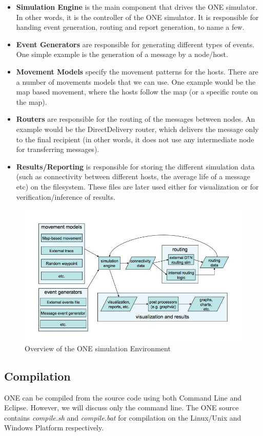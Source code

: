 \begin{itemize}
  \item \textbf{Simulation Engine} is the main component that drives the ONE simulator. In other words, it is the controller of the ONE simulator. It is responsible for handing event generation, routing and report generation, to name a few.
  \item \textbf{Event Generators} are responsible for generating different types of events. One simple example is the generation of a message by a node/host.
  \item \textbf{Movement Models} specify the movement patterns for the hosts. There are a number of movements models that we can use. One example would be the map based movement, where the hosts follow the map (or a specific route on the map).
  \item \textbf{Routers} are responsible for the routing of the messages between nodes. An example would be the DirectDelivery router, which delivers the message only to the final recipient (in other words, it does not use any intermediate node for transferring messages).
  \item \textbf{Results/Reporting} is responsible for storing the different simulation data (such as connectivity between different hosts, the average life of a message etc) on the filesystem. These files are later used either for visualization or for verification/inference of results.
\end{itemize}
\begin{figure}[h]
\includegraphics[scale=0.5]{./figures/one}
\caption{Overview of the ONE simulation Environment \cite{keranen-theone}}
\label{fig:onesimulatorenvironment}
\end{figure}

\subsection{Compilation}
ONE can be compiled from the source code using both Command Line and Eclipse. However, we will discuss only the command line. The ONE source contains \textit{compile.sh} and \textit{compile.bat} for compilation on the Linux/Unix and Windows Platform respectively.
\newline
